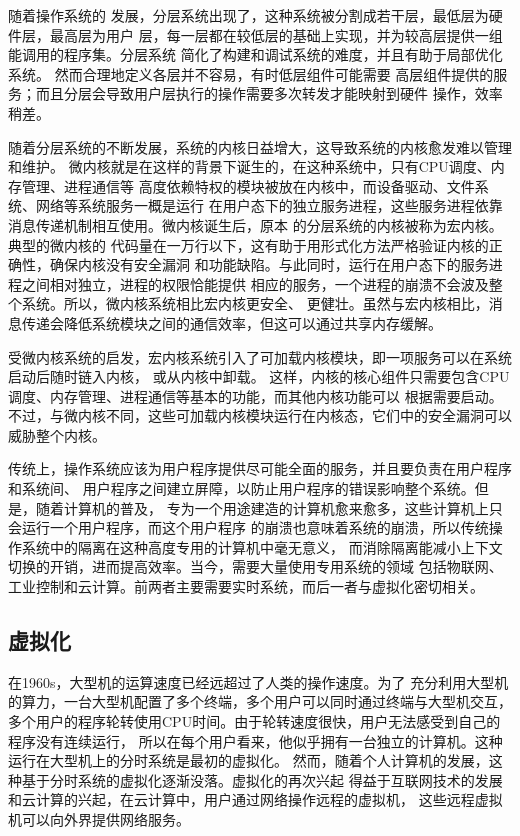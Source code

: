 \documentclass{../runikraft-report}
\begin{document}
随着操作系统的
发展，分层系统出现了，这种系统被分割成若干层，最低层为硬件层，最高层为用户
层，每一层都在较低层的基础上实现，并为较高层提供一组能调用的程序集。分层系统
简化了构建和调试系统的难度，并且有助于局部优化系统。
然而合理地定义各层并不容易，有时低层组件可能需要
高层组件提供的服务；而且分层会导致用户层执行的操作需要多次转发才能映射到硬件
操作，效率稍差。

随着分层系统的不断发展，系统的内核日益增大，这导致系统的内核愈发难以管理和维护。
微内核就是在这样的背景下诞生的，在这种系统中，只有CPU调度、内存管理、进程通信等
高度依赖特权的模块被放在内核中，而设备驱动、文件系统、网络等系统服务一概是运行
在用户态下的独立服务进程，这些服务进程依靠消息传递机制相互使用。微内核诞生后，原本
的分层系统的内核被称为宏内核。典型的微内核的
代码量在一万行以下，这有助于用形式化方法严格验证内核的正确性，确保内核没有安全漏洞
和功能缺陷。与此同时，运行在用户态下的服务进程之间相对独立，进程的权限恰能提供
相应的服务，一个进程的崩溃不会波及整个系统。所以，微内核系统相比宏内核更安全、
更健壮。虽然与宏内核相比，消息传递会降低系统模块之间的通信效率，但这可以通过共享内存缓解。

受微内核系统的启发，宏内核系统引入了可加载内核模块，即一项服务可以在系统启动后随时链入内核，
或从内核中卸载。
这样，内核的核心组件只需要包含CPU调度、内存管理、进程通信等基本的功能，而其他内核功能可以
根据需要启动。不过，与微内核不同，这些可加载内核模块运行在内核态，它们中的安全漏洞可以
威胁整个内核。\cite{bib:os-concept}

传统上，操作系统应该为用户程序提供尽可能全面的服务，并且要负责在用户程序和系统间、
用户程序之间建立屏障，以防止用户程序的错误影响整个系统。但是，随着计算机的普及，
专为一个用途建造的计算机愈来愈多，这些计算机上只会运行一个用户程序，而这个用户程序
的崩溃也意味着系统的崩溃，所以传统操作系统中的隔离在这种高度专用的计算机中毫无意义，
而消除隔离能减小上下文切换的开销，进而提高效率。当今，需要大量使用专用系统的领域
包括物联网、工业控制和云计算。前两者主要需要实时系统，而后一者与虚拟化密切相关。

\subsection{虚拟化}
在1960s，大型机的运算速度已经远超过了人类的操作速度。为了
充分利用大型机的算力，一台大型机配置了多个终端，多个用户可以同时通过终端与大型机交互，
多个用户的程序轮转使用CPU时间。由于轮转速度很快，用户无法感受到自己的程序没有连续运行，
所以在每个用户看来，他似乎拥有一台独立的计算机。这种运行在大型机上的分时系统是最初的虚拟化。
然而，随着个人计算机的发展，这种基于分时系统的虚拟化逐渐没落。虚拟化的再次兴起
得益于互联网技术的发展和云计算的兴起，在云计算中，用户通过网络操作远程的虚拟机，
这些远程虚拟机可以向外界提供网络服务。
\end{document}
